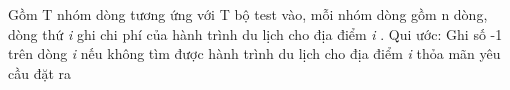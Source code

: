 Gồm T nhóm dòng tương ứng với T bộ test vào, mỗi nhóm dòng gồm n dòng, dòng thứ \emph{ i } ghi chi phí của hành trình du lịch cho địa điểm \emph{ i } . Qui ước: Ghi số -1 trên dòng \emph{ i } nếu không tìm được hành trình du lịch cho địa điểm \emph{ i } thỏa mãn yêu cầu đặt ra